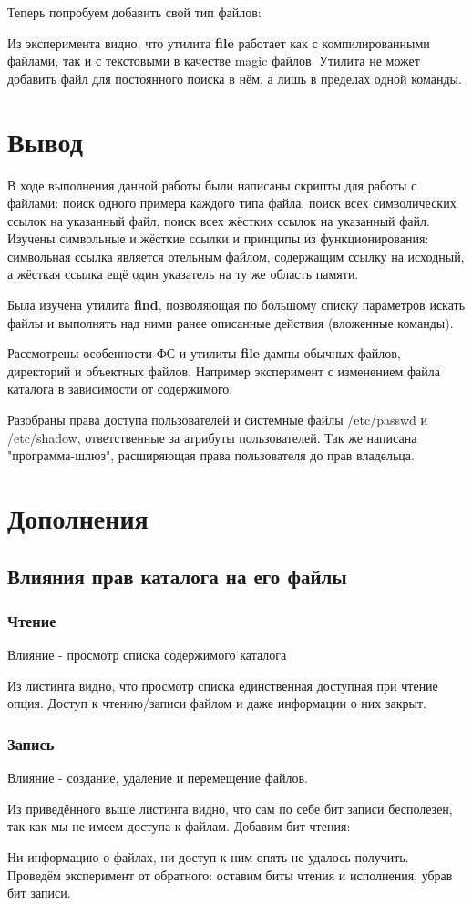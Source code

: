 \documentclass[a4paper]{article}
\begin{document}
Теперь попробуем добавить свой тип файлов:

Из эксперимента  видно, что утилита \textbf{file} работает как с компилированными файлами, так и с текстовыми в качестве  magic файлов. Утилита не может добавить файл для постоянного поиска в нём, а лишь в пределах одной команды.
\section{ Вывод}
В ходе выполнения данной работы были написаны скрипты для работы с файлами: поиск одного примера каждого типа файла, поиск всех символических ссылок на указанный файл, поиск всех жёстких ссылок на указанный файл. Изучены символьные и жёсткие ссылки и принципы из функционирования: символьная ссылка является отельным файлом, содержащим ссылку на исходный, а жёсткая ссылка ещё один указатель на ту же область памяти.

Была изучена утилита \textbf{find}, позволяющая по большому списку параметров искать файлы и выполнять над ними ранее описанные действия (вложенные команды).

Рассмотрены особенности ФС и утилиты \textbf{file} дампы обычных файлов, директорий и объектных файлов. Например эксперимент с изменением файла каталога в зависимости от содержимого.

Разобраны права доступа пользователей и системные файлы /etc/passwd и /etc/shadow, ответственные за атрибуты пользователей. Так же написана "программа-шлюз", расширяющая права пользователя до прав владельца. 

\newpage
\section{Дополнения}
\subsection{Влияния прав каталога на его файлы}
\subsubsection{Чтение}
Влияние - просмотр списка содержимого каталога

Из листинга видно, что просмотр списка единственная доступная при чтение опция. Доступ к чтению/записи файлом и даже информации о них закрыт.\\

\subsubsection{Запись}
Влияние - создание, удаление и перемещение файлов.

Из приведённого выше листинга видно, что сам по себе бит записи бесполезен, так как мы не имеем доступа к файлам. Добавим бит чтения:
 
Ни информацию о файлах, ни доступ к ним опять не удалось получить. Проведём эксперимент от обратного: оставим биты чтения и исполнения, убрав бит записи.

\end{document}
